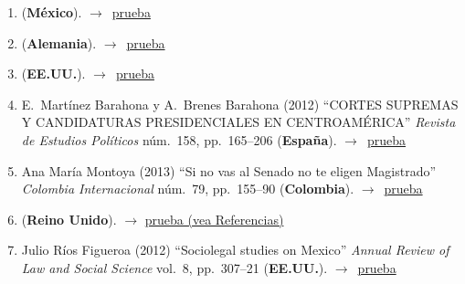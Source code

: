 \documentclass[12 pt, letter]{article}
\newenvironment{CitasMiTrabajo}{
    \begin{footnotesize}
    \begin{enumerate}[label={\footnotesize\emph{cita~\arabic*}},ref=\arabic*] %
        \setlength{\itemsep}{.1\itemsep}
        \setlength{\parskip}{.1\parskip}
    }{\end{enumerate}\end{footnotesize}}
\begin{document}
\begin{CitasMiTrabajo}
          \item {} (\textbf{M\'exico}). $\rightarrow$~\href{https://www.eljuegodelacorte.nexos.com.mx/?p=5970}{prueba}

          \item {} (\textbf{Alemania}). $\rightarrow$~\href{https://www.degruyter.com/view/j/rle.2017.13.issue-1/rle-2015-0040/rle-2015-0040.xml}{prueba}
          
          \item {} (\textbf{EE.UU.}). $\rightarrow$~\href{https://www.jstor.org/stable/pdf/41683128.pdf?casa_token=m2CeIBwwgBQAAAAA:2nu3eD9KAOHQXGIDZA7OGdZVX5ror3lRI-jco2N37zxHQhJnR0LFvNl_KERwlII7qazgsN3TT6AdMNo4Ipp9nVu_QAg5loT0-stZNmZYV1jWC6MUKFA}{prueba}
          
        \item E.~Mart\'inez Barahona y A.~Brenes Barahona (2012) ``CORTES SUPREMAS Y CANDIDATURAS PRESIDENCIALES EN CENTROAM\'ERICA'' \emph{Revista de Estudios Pol\'iticos} n\'um.~158, pp.~165--206 (\textbf{Espa\~na}). $\rightarrow$~\href{https://github.com/emagar/cv/blob/master/citasMiTrab/sanchMagalMagarChapter/mtnzBarahonaCortesCandPres2012rep.pdf}{prueba}

        \item Ana Mar\'ia Montoya (2013) ``Si no vas al Senado no te eligen Magistrado'' \emph{Colombia Internacional} n\'um.~79, pp.~155--90 (\textbf{Colombia}). $\rightarrow$~\href{https://github.com/emagar/cv/blob/master/citasMiTrab/sanchMagalMagarChapter/montoya2013.pdf}{prueba}

        \item {} (\textbf{Reino Unido}). $\rightarrow$ \href{https://www.cambridge.org/core/journals/british-journal-of-political-science/article/judicial-instability-and-endogenous-constitutional-change-lessons-from-latin-america/60789D239F907B3584DA3DB1D4EC431D}{prueba (vea Referencias)}

        \item Julio R\'ios Figueroa (2012) ``Sociolegal studies on Mexico'' \emph{Annual Review of Law and Social Science} vol.~8, pp.~307--21 (\textbf{EE.UU.}). $\rightarrow$~\href{https://github.com/emagar/cv/blob/master/citasMiTrab/sanchMagalMagarChapter/riosSociolegalMex2012.pdf}{prueba}


\end{CitasMiTrabajo}
\end{document}
